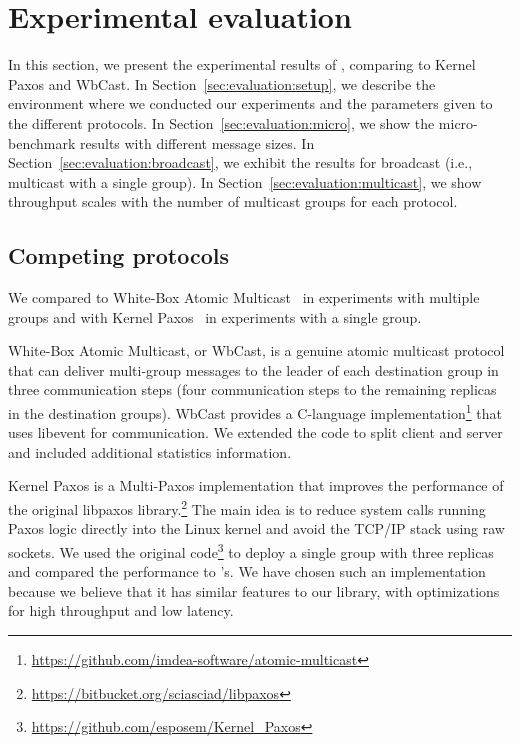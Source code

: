 \section{Experimental evaluation}
\label{sec:experimental-evaluation}

In this section, we present the experimental results of \libname, comparing to Kernel Paxos 
and WbCast. %
In Section~\ref{sec:evaluation:setup}, we describe the environment where we conducted our experiments and the parameters given to the different protocols.
In Section~\ref{sec:evaluation:micro}, we show the micro-benchmark results with different message sizes.
In Section~\ref{sec:evaluation:broadcast}, we exhibit the results for broadcast (i.e., multicast with a single group).
In Section~\ref{sec:evaluation:multicast}, we show throughput scales with the number of multicast groups for each protocol.

\subsection{Competing protocols}

We compared
\libname to White-Box Atomic Multicast~\cite{gotsman2019white} in experiments
with multiple groups and with Kernel Paxos~\cite{esposito2018kernel} in
experiments with a single group.

White-Box Atomic Multicast, or WbCast, is a genuine atomic multicast protocol that can deliver multi-group messages to the leader of each destination group in three communication steps (four communication steps to the remaining replicas in the destination groups).
 WbCast provides a C-language implementation\footnote{\url{https://github.com/imdea-software/atomic-multicast}} that uses libevent for communication.
 We extended the code to split client and server and included additional statistics information.

Kernel Paxos is a Multi-Paxos implementation that improves the performance of the original libpaxos library.\footnote{\url{https://bitbucket.org/sciasciad/libpaxos}}
The main idea is to reduce system calls running Paxos logic directly into the Linux kernel and avoid the TCP/IP stack using raw sockets. 
We used the original code\footnote{\url{https://github.com/esposem/Kernel_Paxos}} to deploy a single group with three replicas and compared the performance to \libname's.
We have chosen such an implementation because we believe that it has similar features to our library, with optimizations for high throughput and low latency.


